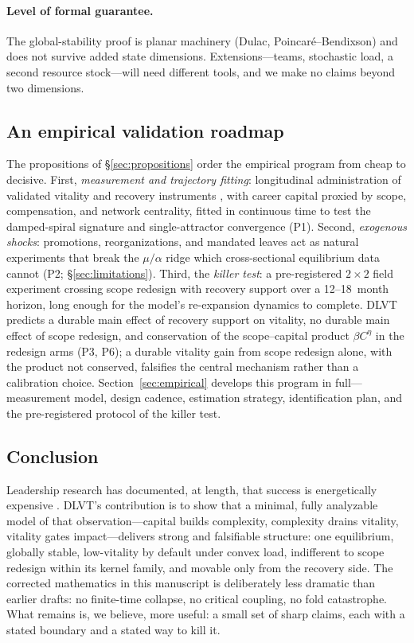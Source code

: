 \paragraph{Level of formal guarantee.} The global-stability proof is
planar machinery (Dulac, Poincar\'e--Bendixson) and does not survive added
state dimensions. Extensions---teams, stochastic load, a second resource
stock---will need different tools, and we make no claims beyond two
dimensions.

\subsection{An empirical validation roadmap}
\label{sec:roadmap}

The propositions of \S\ref{sec:propositions} order the empirical program
from cheap to decisive. First, \emph{measurement and trajectory fitting}:
longitudinal administration of validated vitality and recovery instruments
\citep{ryan1997subjective,sonnentag2007recovery}, with career capital
proxied by scope, compensation, and network centrality, fitted in
continuous time to test the damped-spiral signature and single-attractor
convergence (P1). Second, \emph{exogenous shocks}: promotions,
reorganizations, and mandated leaves act as natural experiments that break
the $\mu/\alpha$ ridge which cross-sectional equilibrium data cannot (P2;
\S\ref{sec:limitations}). Third, the \emph{killer test}: a pre-registered
$2{\times}2$ field experiment crossing scope redesign with recovery
support over a 12--18~month horizon, long enough for the model's
re-expansion dynamics to complete. DLVT predicts a durable main effect of
recovery support on vitality, no durable main effect of scope redesign,
and conservation of the scope--capital product $\beta C^{\eta}$ in the
redesign arms (P3, P6); a durable vitality gain from scope redesign alone,
with the product not conserved, falsifies the central mechanism rather
than a calibration choice. Section~\ref{sec:empirical} develops this
program in full---measurement model, design cadence, estimation strategy,
identification plan, and the pre-registered protocol of the killer test.

\subsection{Conclusion}
\label{sec:conclusion}

Leadership research has documented, at length, that success is
energetically expensive \citep{hambrick2005executive,rudolph2020healthy}.
DLVT's contribution is to show that a minimal, fully analyzable model of
that observation---capital builds complexity, complexity drains vitality,
vitality gates impact---delivers strong and falsifiable structure: one
equilibrium, globally stable, low-vitality by default under convex load,
indifferent to scope redesign within its kernel family, and movable only
from the recovery side. The corrected mathematics in this manuscript is
deliberately less dramatic than earlier drafts: no finite-time collapse,
no critical coupling, no fold catastrophe. What remains is, we believe,
more useful: a small set of sharp claims, each with a stated boundary and
a stated way to kill it.
